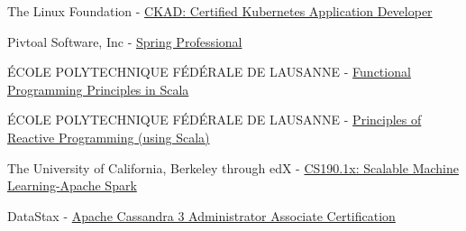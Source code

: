 \begin{cvitems}
\sectionspace
\sectionspace
\vspace{1mm}
	\fontsize{11pt}{1.4em}\bodyfontlight\upshape\color{text}
        \item {The Linux Foundation} - {\href{https://www.credly.com/badges/1970a882-de77-4c30-9704-88b4a052ecff/linked_in_profile}{CKAD: Certified Kubernetes Application Developer}}
        \item {Pivtoal Software, Inc} - {\href{https://bcert.me/bc/html/show-badge.html?b=gfcjzxzu}{Spring Professional}}
        \item {ÉCOLE POLYTECHNIQUE FÉDÉRALE DE LAUSANNE} - {\href{https://www.coursera.org/account/accomplishments/certificate/MVD9BHZ3V6}{Functional Programming Principles in Scala}}
        \item {ÉCOLE POLYTECHNIQUE FÉDÉRALE DE LAUSANNE} - {\href{https://www.coursera.org/account/accomplishments/verify/USHJQZYKSQ}{Principles of Reactive Programming (using Scala)}}
        \item {The University of California, Berkeley through edX} - {\href{https://verify.edx.org/cert/92169a42642b43e9afe117dd761e6c4f}{CS190.1x: Scalable Machine Learning-Apache Spark}}        
        \item {DataStax} - {\href{https://certification.mettl.com/datastax/applicant/verify-certification-with-qr?email=mohanmca%40gmail.com&assessment=Apache%20Cassandra%203%20Administrator%20Associate%20Certification&date=Jul%2031,%202021}{Apache Cassandra 3 Administrator Associate Certification}}        
    \end{cvitems}
\vspace{1mm}
\sectionspace